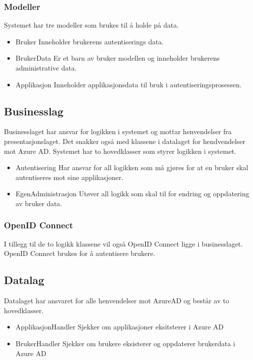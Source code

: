\bigskip
\subsubsection{Modeller}
\label{subsec:logisk_view_modeller}
Systemet har tre modeller som brukes til å holde på data.
\newline
\begin{itemize}
\item Bruker
\newline Inneholder brukerens autentiserings data.
\item BrukerData
\newline Er et barn av bruker modellen og inneholder brukerens administrative data.
\item Applikasjon
\newline Inneholder applikasjonsdata til bruk i autentiseringsprosessen.
\end{itemize}

\subsection{Businesslag}
\label{subsec:logisk_view_buisnesslag}
Businesslaget har ansvar for logikken i systemet og mottar henvendelser fra presentasjonslaget. Det snakker også med klassene i datalaget for hendvendelser mot Azure AD. Systemet har to hovedklasser som styrer logikken i systemet.
\newline
\begin{itemize}
\item Autentisering
\newline Har ansvar for all logikken som må gjøres for at en bruker skal autentiseres mot sine applikasjoner.
\item EgenAdministrasjon
\newline Utøver all logikk som skal til for endring og oppdatering av bruker data.
\end{itemize}

\subsubsection{OpenID Connect}
\label{subsubsec:logsik_view_buisnesslag_openid_connect}
I tillegg til de to logikk klassene vil også OpenID Connect ligge i businesslaget. OpenID Connect brukes for å autentisere brukere.

\subsection{Datalag}
\label{subsec:logsik_view_datalag}
Datalaget har ansvaret for alle henvendelser mot AzureAD og består av to hovedklasser.
\newline
\begin{itemize}
\item ApplikasjonHandler
\newline Sjekker om applikasjoner eksitsterer i Azure AD
\item BrukerHandler
\newline Sjekker om brukere eksisterer og oppdaterer brukerdata  i Azure AD
\end{itemize}

